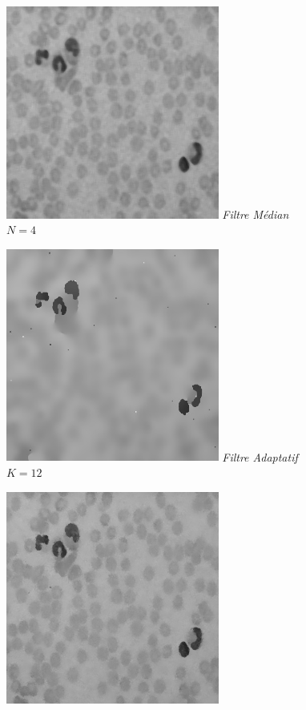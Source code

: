 \documentclass[a4,12pt]{article}
\begin{document}
\noindent
\begin{center}
	\begin{minipage}[c]{0.45\linewidth}
		\begin{center}
			\includegraphics[width = 70mm]{./img/globb25Med4.jpg}
			\textit{Filtre Médian}\\
			\textit{$N=4$}\\
                        \hspace{2em}
		\end{center}
	\end{minipage}
	\begin{minipage}[c]{0.45\linewidth}
		\begin{center}
			\includegraphics[width = 70mm]{./img/globAdapt12.jpg}
			\textit{Filtre Adaptatif}\\
			\textit{$K = 12$}\\
                        \hspace{2em}
		\end{center}
	\end{minipage}
	\begin{minipage}[c]{0.45\linewidth}
		\begin{center}
			\includegraphics[width = 70mm]{./img/globb25Bilateral_5_20.jpg}

\end{center}
\end{minipage}
\end{center}
\end{document}
